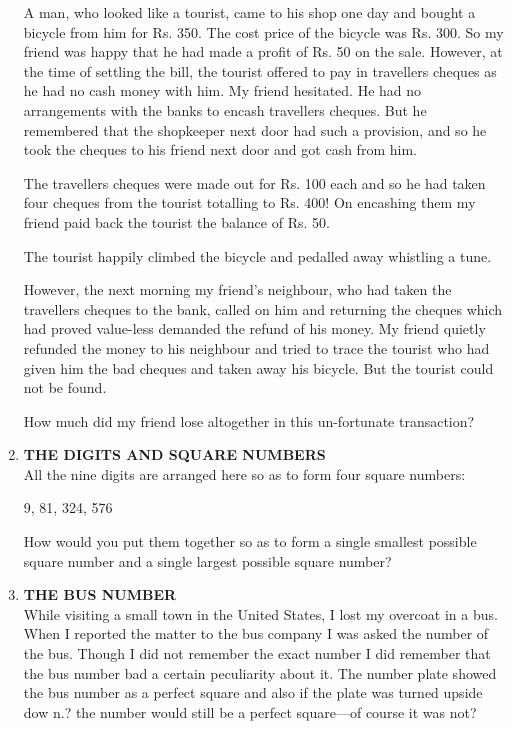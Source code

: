 \documentclass[12pt]{article}
\begin{document}
\begin{enumerate}
A man,  who  looked  like a tourist,  came  to his shop one day  and  bought  a bicycle  from  him  for  Rs. 350. The cost  price  of the  bicycle  was  Rs.  300.  So  my friend  was  happy  that  he had  made  a profit  of Rs. 50 on the sale.  However,  at the time  of settling  the bill,  the tourist  offered  to pay  in travellers  cheques  as he had no cash money  with  him.  My  friend  hesitated.  He  had no arrangements  with  the  banks  to encash  travellers cheques.  But  he remembered  that  the  shopkeeper  next door  had such  a provision,  and so he took  the  cheques to his friend  next  door  and got cash  from  him. 

The travellers  cheques  were  made  out for Rs. 100 each and so he had taken  four  cheques  from  the tourist totalling  to Rs.  400!  On  encashing  them  my friend paid back  the tourist  the balance  of Rs. 50. 

The tourist  happily  climbed  the  bicycle  and pedalled away  whistling  a tune. 

However,  the next  morning  my friend's  neighbour,  who had taken  the  travellers  cheques  to the bank,  called  on him and returning  the cheques  which  had  proved  value-less demanded  the  refund  of his money.  My  friend quietly  refunded  the  money  to his neighbour  and tried to trace  the tourist  who  had given  him  the  bad  cheques and taken  away  his bicycle.  But  the  tourist  could  not be found. 

How  much  did my friend  lose  altogether  in this  un-fortunate  transaction? 
%
\item  \textbf{THE DIGITS  AND  SQUARE  NUMBERS} \\
All the  nine  digits  are  arranged  here  so as to form four square  numbers: 

9, 81,  324,  576 

How  would  you  put  them  together  so as to form  a single  smallest  possible  square  number  and a single  largest possible  square  number? 

%
\item  \textbf{THE  BUS  NUMBER} \\
While  visiting  a small  town  in the  United  States,  I lost my overcoat  in a bus.  When  I reported  the matter  to the bus company  I was asked  the number  of the bus.  Though I did not  remember  the  exact  number  I did  remember that the bus number  bad  a certain  peculiarity  about  it. The number  plate  showed  the  bus number  as a perfect square  and also  if the plate  was  turned upside  dow n.? the number  would  still  be a perfect  square—of  course  it was not? 


\end{enumerate}
\end{document}
